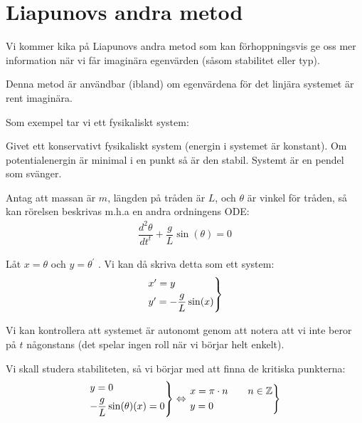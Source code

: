 \section{Liapunovs andra metod}
\par\bigskip
\noindent Vi kommer kika på Liapunovs andra metod som kan förhoppningsvis ge oss mer information när vi får imaginära egenvärden (såsom stabilitet eller typ).\par
\noindent Denna metod är användbar (ibland) om egenvärdena för det linjära systemet är rent imaginära.
\par\bigskip
\noindent Som exempel tar vi ett fysikaliskt system:\par
\noindent Givet ett konservativt fysikaliskt system (energin i systemet är konstant). Om potentialenergin är minimal i en punkt så är den stabil. Systemt är en pendel som svänger.\par
\noindent Antag att massan är $m$, längden på tråden är $L$, och $\theta$ är vinkel för tråden, så kan rörelsen beskrivas m.h.a en andra ordningens ODE:
\begin{equation*}
  \begin{gathered}
    \dfrac{d^2\theta}{dt^t} + \dfrac{g}{L}\sin(\theta) = 0
  \end{gathered}
\end{equation*}\par
\noindent Låt $x=\theta$ och $y=\theta^{\prime}$ . Vi kan då skriva detta som ett system:
\begin{equation*}
  \begin{gathered}
    \begin{rcases*}
      x^{\prime} = y\\
      y^{\prime} = -\dfrac{g}{L}\sin(x)
    \end{rcases*}
  \end{gathered}
\end{equation*}\par
\noindent Vi kan kontrollera att systemet är autonomt genom att notera att vi inte beror på $t$ någonstans (det spelar ingen roll när vi börjar helt enkelt).\par
\noindent Vi skall studera stabiliteten, så vi börjar med att finna de kritiska punkterna:
\begin{equation*}
  \begin{gathered}
    \begin{rcases*}
      y=0\\
      -\dfrac{g}{L}\sin(\theta)(x)=0
    \end{rcases*}\Lrarr
    \begin{rcases*}
      x = \pi\cdot n\qquad n\in\Z\\
      y=0
    \end{rcases*}
  \end{gathered}
\end{equation*}\par
